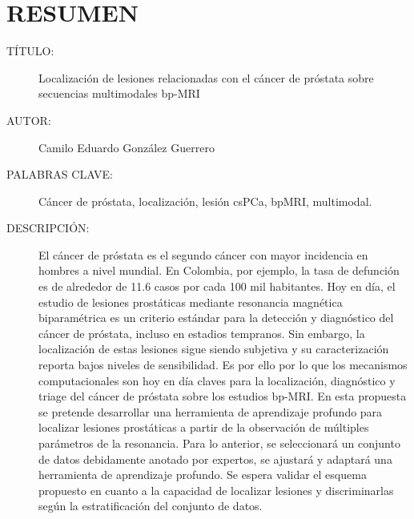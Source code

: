 
\chapter*{RESUMEN}

\footnotesize{
\begin{description}
  \item[TÍTULO:] Localización de lesiones relacionadas con el cáncer de próstata sobre secuencias multimodales bp-MRI
  \item[AUTOR:] Camilo Eduardo González Guerrero
  \item[PALABRAS CLAVE:] Cáncer de próstata, localización, lesión csPCa, bpMRI, multimodal.
  \item[DESCRIPCIÓN:] 
El cáncer de próstata es el segundo cáncer con mayor incidencia en hombres a nivel mundial. En Colombia, por ejemplo, la tasa de defunción es de alrededor de 11.6 casos por cada 100 mil habitantes. Hoy en día, el estudio de lesiones prostáticas mediante resonancia magnética biparamétrica es un criterio estándar para la detección y diagnóstico del cáncer de próstata, incluso en estadios tempranos. Sin embargo, la localización de estas lesiones sigue siendo subjetiva y su caracterización reporta bajos niveles de sensibilidad. Es por ello por lo que los mecanismos computacionales son hoy en día claves para la localización, diagnóstico y triage del cáncer de próstata sobre los estudios bp-MRI. En esta propuesta se pretende desarrollar una herramienta de aprendizaje profundo para localizar lesiones prostáticas a partir de la observación de múltiples parámetros de la resonancia. Para lo anterior, se seleccionará un conjunto de datos debidamente anotado por expertos, se ajustará y adaptará una herramienta de aprendizaje profundo. Se espera validar el esquema propuesto en cuanto a la capacidad de localizar lesiones y discriminarlas según la estratificación del conjunto de datos. 
 
\end{description}
}\normalsize
